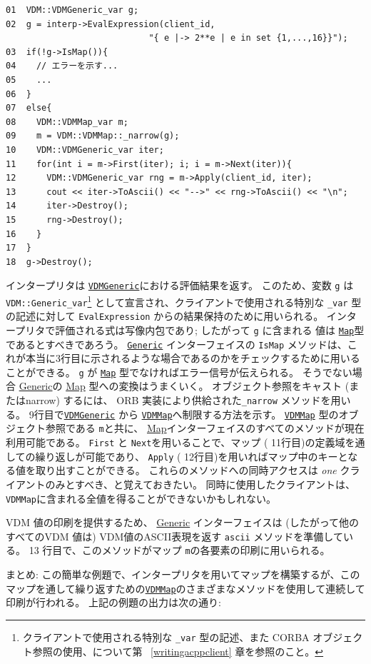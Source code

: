 \documentclass[\pformat,12pt]{jarticle}
\newcommand{\Generic}{\hyperlink{interface.Generic}{Generic}}
\newcommand{\VDMGeneric}{\hyperlink{interface.Generic}{VDMGeneric}}
\newcommand{\VDMMap}{\hyperlink{interface.VDMMap}{VDMMap}}
\newcommand{\Map}{\hyperlink{interface.VDMMap}{Map}}
\begin{document}
\begin{verbatim}
01  VDM::VDMGeneric_var g;
02  g = interp->EvalExpression(client_id, 
                            "{ e |-> 2**e | e in set {1,...,16}}");
03  if(!g->IsMap()){
04    // エラーを示す...
05    ...
06  }
07  else{
08    VDM::VDMMap_var m;
09    m = VDM::VDMMap::_narrow(g);
10    VDM::VDMGeneric_var iter;
11    for(int i = m->First(iter); i; i = m->Next(iter)){
12      VDM::VDMGeneric_var rng = m->Apply(client_id, iter);
13      cout << iter->ToAscii() << "-->" << rng->ToAscii() << "\n"; 
14      iter->Destroy();
15      rng->Destroy();
16    }
17  }
18  g->Destroy();
\end{verbatim}

インタープリタは {\tt  \VDMGeneric}における評価結果を返す。
このため、変数 {\tt g} は {\tt  VDM::Generic\_var}\footnote{クライアントで使用される特別な {\tt \_var} 型の記述、また CORBA オブジェクト参照の使用、について第 ~\ref{writingacppclient} 章を参照のこと。} として宣言され、クライアントで使用される特別な {\tt \_var} 型の記述に対して {\tt EvalExpression} からの結果保持のために用いられる。 
インタープリタで評価される式は写像内包であり; したがって {\tt g} に含まれる
値は  {\tt \Map}型であるとすべきであろう。
 {\tt \Generic} インターフェイスの {\tt IsMap} メソッドは、これが本当に3行目に示されるような場合であるのかをチェックするために用いることができる。
 {\tt g} が {\tt \Map} 型でなければエラー信号が伝えられる。
そうでない場合 {\Generic}の {\Map} 型への変換はうまくいく。
オブジェクト参照をキャスト (またはnarrow) するには、 ORB 実装により供給された{\tt \_narrow} メソッドを用いる。 
 9行目で{\tt \VDMGeneric} から {\tt \VDMMap}へ制限する方法を示す。
{\tt \VDMMap} 型のオブジェクト参照である {\tt m}と共に、 {\Map}インターフェイスのすべてのメソッドが現在利用可能である。
{\tt First} と {\tt Next}を用いることで、マップ ( 11行目)の定義域を通しての繰り返しが可能であり、 {\tt Apply} ( 12行目)を用いればマップ中のキーとなる値を取り出すことができる。
これらのメソッドへの同時アクセスは \emph{one} クライアントのみとすべき、と覚えておきたい。
同時に使用したクライアントは、 {\tt VDMMap}に含まれる全値を得ることができないかもしれない。

VDM 値の印刷を提供するため、 {\Generic} インターフェイスは (したがって他のすべてのVDM 値は) VDM値のASCII表現を返す {\tt ascii} メソッドを準備している。
13 行目で、このメソッドがマップ {\tt m}の各要素の印刷に用いられる。

まとめ: この簡単な例題で、インタープリタを用いてマップを構築するが、このマップを通して繰り返すための{\tt \VDMMap}のさまざまなメソッドを使用して連続して印刷が行われる。
上記の例題の出力は次の通り: 
\end{document}
